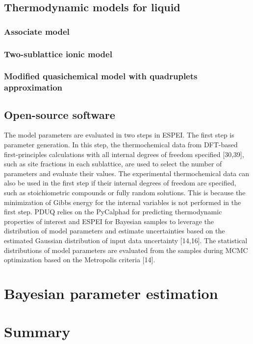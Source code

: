 \subsection{Thermodynamic models for liquid} \label{method:ssec:liqmodels}

\subsubsection{Associate model} \label{method:sssec:assm}

\subsubsection{Two-sublattice ionic model} \label{method:sssec:ionic}

\subsubsection{Modified quasichemical model with quadruplets approximation} \label{method:ssec:mqmqa}

\subsection{Open-source software} \label{method:ssec:tools}
The model parameters are evaluated in two steps in ESPEI. The first step is parameter generation. In this step, the thermochemical data from DFT-based first-principles calculations with all internal degrees of freedom specified [30,39], such as site fractions in each sublattice, are used to select the number of parameters and evaluate their values. The experimental thermochemical data can also be used in the first step if their internal degrees of freedom are specified, such as stoichiometric compounds or fully random solutions. This is because the minimization of Gibbs energy for the internal variables is not performed in the first step. PDUQ relies on the PyCalphad for predicting thermodynamic properties of interest and ESPEI for Bayesian samples to leverage the distribution of model parameters and estimate uncertainties based on the estimated Gaussian distribution of input data uncertainty [14,16]. The statistical distributions of model parameters are evaluated from the samples during MCMC optimization based on the Metropolis criteria [14].


\section{Bayesian parameter estimation} \label{method:ssec:Bayesian}

\section{Summary} \label{method:ssec:summary}
